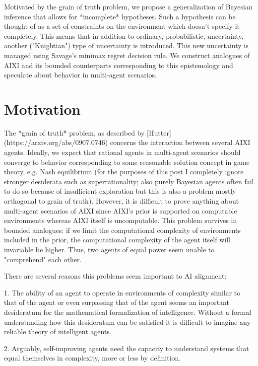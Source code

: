 \documentclass[a4paper]{article}
\begin{document}
Motivated by the grain of truth problem, we propose a generalization of Bayesian inference that allows for *incomplete* hypotheses. Such a hypothesis can be thought of as a set of constraints on the environment which doesn't specify it completely. This means that in addition to ordinary, probabilistic, uncertainty, another ("Knightian") type of uncertainty is introduced. This new uncertainty is managed using Savage's minimax regret decision rule. We construct analogues of AIXI and its bounded counterparts corresponding to this epistemology and speculate about behavior in multi-agent scenarios.

\section{Motivation}

The *grain of truth* problem, as described by [Hutter](https://arxiv.org/abs/0907.0746) concerns the interaction between several AIXI agents. Ideally, we expect that rational agents in multi-agent scenarios should converge to behavior corresponding to some reasonable solution concept in game theory, e.g. Nash equilibrium (for the purposes of this post I completely ignore stronger desiderata such as superrationality; also purely Bayesian agents often fail to do so because of insufficient exploration but this is also a problem mostly orthogonal to grain of truth). However, it is difficult to prove anything about multi-agent scenarios of AIXI since AIXI's prior is supported on computable environments whereas AIXI itself is uncomputable. This problem survives in bounded analogues: if we limit the computational complexity of environments included in the prior, the computational complexity of the agent itself will invariable be higher. Thus, two agents of equal power seem unable to "comprehend" each other.

There are several reasons this problems seem important to AI alignment:

1. The ability of an agent to operate in environments of complexity similar to that of the agent or even surpassing that of the agent seems an important desideratum for the mathematical formalization of intelligence. Without a formal understanding how this desideratum can be satisfied it is difficult to imagine any reliable theory of intelligent agents.

2. Arguably, self-improving agents need the capacity to understand systems that equal themselves in complexity, more or less by definition.
\end{document}
